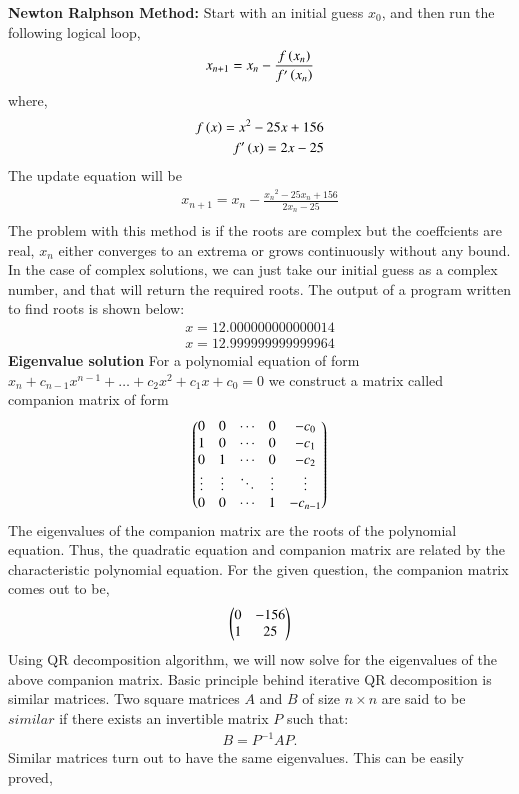 \documentclass[journal]{IEEEtran}
\begin{document}
\textbf{Newton Ralphson Method:}\newline
Start with an initial guess $x_0$, and then run the following logical loop,
\begin{align}
    x_{n+1} = x_n - \frac{f\left(x_n\right)}{f^{\prime}\left(x_n\right)} 
\end{align}
where,
\begin{align}
    f\left(x\right) = x^2 - 25x + 156\\
    f^{\prime}\left(x\right) = 2x - 25
\end{align}
The update equation will be
\begin{align}
	x_{n+1} = x_n - \frac{{x_n}^2 - 25x_n + 156}{2x_n - 25}\\
\end{align}
The problem with this method is if the roots are complex but the coeffcients are real, $x_n$ either converges to an extrema or grows continuously without any bound. 
In the case of complex solutions, we can just take our initial guess as a complex number, and that will return the required roots.
The output of a program written to find roots is shown below:
\begin{align}
  x = 12.000000000000014 \\
  x = 12.999999999999964
\end{align}
\textbf{Eigenvalue solution}\newline
For a polynomial equation of form $x_n+c_{n-1}x^{n-1}+\dots+c_2x^2+c_1x+c_0 = 0$ we construct a matrix called companion matrix of form
\begin{align}
  \begin{pmatrix}
    0 & 0 & \cdots & 0 & -c_0\\
    1 & 0 & \cdots & 0 & -c_1\\
    0 & 1 & \cdots & 0 & -c_2\\
    \vdots & \vdots & \ddots & \vdots & \vdots\\
    0 & 0 & \cdots & 1 & -c_{n-1}\\
  \end{pmatrix}
\end{align}
The eigenvalues of the companion matrix are the roots of the polynomial equation. Thus, the quadratic equation and companion matrix are related by the characteristic polynomial equation. For the given question, the companion matrix comes out to be,
\begin{align}
  \begin{pmatrix}0 & -156 \\ 1 & 25\end{pmatrix}
\end{align}
Using QR decomposition algorithm, we will now solve for the eigenvalues of the above companion matrix. \newline \newline Basic principle behind iterative QR decomposition is similar matrices.
Two square matrices $A$ and $B$ of size $n \times n$ are said to be $similar$ if there exists an invertible matrix $P$ such that:
\begin{align}
B = P^{-1} A P.
\end{align}
Similar matrices turn out to have the same eigenvalues. This can be easily proved,
\end{document}
